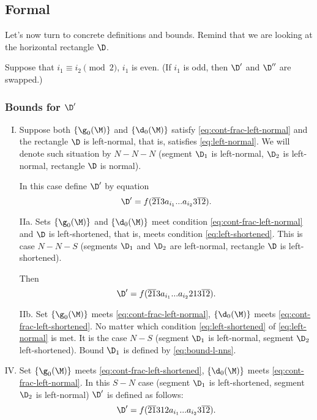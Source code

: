\subsection{Formal}
\label{sbsc:boundaries_formal}

Let's now turn to concrete definitions and bounds.
Remind that we are looking at the horizontal rectangle $\D$.

Suppose that $i_1 \equiv i_2 \pmod 2$, $i_1$ is even.
(If $i_1$ is odd, then $\D'$ and $\D''$ are swapped.)

\subsubsection{Bounds for $\D'$}

\begin{enumerate}[I.]
	\item Suppose both $\{\g_0(\M)\}$ and $\{\d_0(\M)\}$
	satisfy \ref{eq:cont-frac-left-normal} and the rectangle $\D$ is left-normal,
	that is, satisfies \ref{eq:left-normal}.
	We will denote such situation by $N-N-N$
	(segment $\D_1$ is left-normal, $\D_2$ is left-normal, rectangle $\D$ is normal).
	
	In this case define $\D'$ by equation
	\begin{equation}
		\D' = f(\overline{21}3a_{i_1}... a_{i_2}3\overline{12}).
	\end{equation}
	
	\item[IIa.] Sets $\{\g_0(\M)\}$ and $\{\d_0(\M)\}$
	meet condition \ref{eq:cont-frac-left-normal}
	and $\D$ is left-shortened, that is, meets condition \ref{eq:left-shortened}.
	This is case $N-N-S$
	(segments $\D_1$ and $\D_2$ are left-normal, rectangle $\D$ is left-shortened).
	
	Then
	\begin{equation}\label{eq:bound-l-nns}
		\D' = f(\overline{21}3a_{i_1}... a_{i_2}213\overline{12}).
	\end{equation}
	
	\item[IIb.] Set $\{\g_0(\M)\}$ meets \ref{eq:cont-frac-left-normal},
	$\{\d_0(\M)\}$ meets \ref{eq:cont-frac-left-shortened}.
	No matter which condition \ref{eq:left-shortened} of \ref{eq:left-normal} is met.
	It is the case $N-S$
	(segment $\D_1$ is left-normal, segment $\D_2$ left-shortened).
	Bound $\D_1$ is defined by \ref{eq:bound-l-nns}.
	
	\addtocounter{enumi}{1}
	\item Set $\{\g_0(\M)\}$ meets \ref{eq:cont-frac-left-shortened},
	$\{\d_0(\M)\}$ meets \ref{eq:cont-frac-left-normal}.
	In this $S-N$ case
	(segment $\D_1$ is left-shortened, segment $\D_2$ is left-normal)
	$\D'$ is defined as follows:
	\begin{equation}
		\D' = f(\overline{21}312a_{i_1}... a_{i_2}3\overline{12}).
	\end{equation}
	

\end{enumerate}
